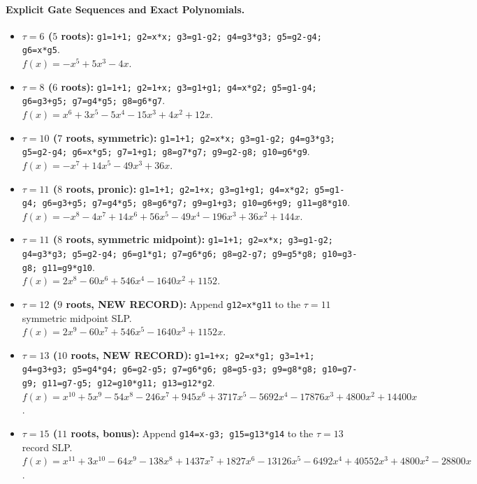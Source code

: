 \documentclass[11pt]{article}
\newcommand{\code}[1]{\texttt{#1}}
\begin{document}
\paragraph{Explicit Gate Sequences and Exact Polynomials.}
\begin{itemize}[leftmargin=1.4em,itemsep=2pt]
  \item \textbf{$\tau = 6$ ($5$ roots):}
  \code{g1=1+1; g2=x*x; g3=g1-g2; g4=g3*g3; g5=g2-g4; g6=x*g5}.\\
  $f(x) = -x^5 + 5x^3 - 4x$.
  \item \textbf{$\tau = 8$ ($6$ roots):}
  \code{g1=1+1; g2=1+x; g3=g1+g1; g4=x*g2; g5=g1-g4; g6=g3+g5; g7=g4*g5; g8=g6*g7}.\\
  $f(x) = x^6 + 3x^5 - 5x^4 - 15x^3 + 4x^2 + 12x$.
  \item \textbf{$\tau = 10$ ($7$ roots, symmetric):}
  \code{g1=1+1; g2=x*x; g3=g1-g2; g4=g3*g3; g5=g2-g4; g6=x*g5; g7=1+g1; g8=g7*g7; g9=g2-g8; g10=g6*g9}.\\
  $f(x) = -x^7 + 14x^5 - 49x^3 + 36x$.
  \item \textbf{$\tau = 11$ ($8$ roots, pronic):}
  \code{g1=1+1; g2=1+x; g3=g1+g1; g4=x*g2; g5=g1-g4; g6=g3+g5; g7=g4*g5; g8=g6*g7; g9=g1+g3; g10=g6+g9; g11=g8*g10}.\\
  $f(x) = -x^8 - 4x^7 + 14x^6 + 56x^5 - 49x^4 - 196x^3 + 36x^2 + 144x$.
  \item \textbf{$\tau = 11$ ($8$ roots, symmetric midpoint):}
  \code{g1=1+1; g2=x*x; g3=g1-g2; g4=g3*g3; g5=g2-g4; g6=g1*g1; g7=g6*g6; g8=g2-g7; g9=g5*g8; g10=g3-g8; g11=g9*g10}.\\
  $f(x) = 2x^8 - 60x^6 + 546x^4 - 1640x^2 + 1152$.
  \item \textbf{$\tau = 12$ ($9$ roots, NEW RECORD):}
  Append \code{g12=x*g11} to the $\tau = 11$ symmetric midpoint SLP.\\
  $f(x) = 2x^9 - 60x^7 + 546x^5 - 1640x^3 + 1152x$.
  \item \textbf{$\tau = 13$ ($10$ roots, NEW RECORD):}
  \code{g1=1+x; g2=x*g1; g3=1+1; g4=g3+g3; g5=g4*g4; g6=g2-g5; g7=g6*g6; g8=g5-g3; g9=g8*g8; g10=g7-g9; g11=g7-g5; g12=g10*g11; g13=g12*g2}.\\
  $f(x) = x^{10} + 5x^9 - 54x^8 - 246x^7 + 945x^6 + 3717x^5 - 5692x^4 - 17876x^3 + 4800x^2 + 14400x$.
  \item \textbf{$\tau = 15$ ($11$ roots, bonus):}
  Append \code{g14=x-g3; g15=g13*g14} to the $\tau = 13$ record SLP.\\
  $f(x) = x^{11} + 3x^{10} - 64x^9 - 138x^8 + 1437x^7 + 1827x^6 - 13126x^5 - 6492x^4 + 40552x^3 + 4800x^2 - 28800x$.
\end{itemize}
\end{document}
